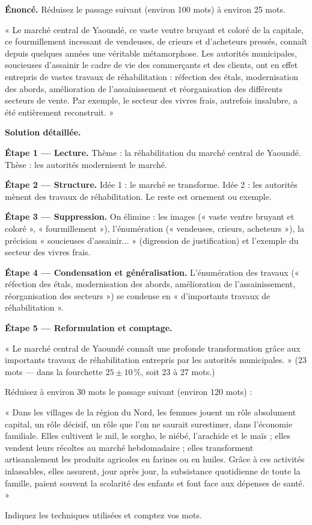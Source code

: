 \documentclass[11pt]{article}
\begin{document}
\begin{exoresolu}
\textbf{Énoncé.} Réduisez le passage suivant (environ 100 mots) à environ 25 mots.

« Le marché central de Yaoundé, ce vaste ventre bruyant et coloré de la capitale, ce fourmillement incessant de vendeuses, de crieurs et d'acheteurs pressés, connaît depuis quelques années une véritable métamorphose. Les autorités municipales, soucieuses d'assainir le cadre de vie des commerçants et des clients, ont en effet entrepris de vastes travaux de réhabilitation : réfection des étals, modernisation des abords, amélioration de l'assainissement et réorganisation des différents secteurs de vente. Par exemple, le secteur des vivres frais, autrefois insalubre, a été entièrement reconstruit. »

\tcblower

\textbf{Solution détaillée.}

\textbf{Étape 1 — Lecture.} Thème : la réhabilitation du marché central de Yaoundé. Thèse : les autorités modernisent le marché.

\textbf{Étape 2 — Structure.} Idée 1 : le marché se transforme. Idée 2 : les autorités mènent des travaux de réhabilitation. Le reste est ornement ou exemple.

\textbf{Étape 3 — Suppression.} On élimine : les images (« vaste ventre bruyant et coloré », « fourmillement »), l'énumération (« vendeuses, crieurs, acheteurs »), la précision « soucieuses d'assainir... » (digression de justification) et l'exemple du secteur des vivres frais.

\textbf{Étape 4 — Condensation et généralisation.} L'énumération des travaux (« réfection des étals, modernisation des abords, amélioration de l'assainissement, réorganisation des secteurs ») se condense en « d'importants travaux de réhabilitation ».

\textbf{Étape 5 — Reformulation et comptage.}

« Le marché central de Yaoundé connaît une profonde transformation grâce aux importants travaux de réhabilitation entrepris par les autorités municipales. » (23 mots — dans la fourchette $25 \pm 10\,\%$, soit 23 à 27 mots.)
\end{exoresolu}

\begin{exercice}
Réduisez à environ 30 mots le passage suivant (environ 120 mots) :

« Dans les villages de la région du Nord, les femmes jouent un rôle absolument capital, un rôle décisif, un rôle que l'on ne saurait surestimer, dans l'économie familiale. Elles cultivent le mil, le sorgho, le niébé, l'arachide et le maïs ; elles vendent leurs récoltes au marché hebdomadaire ; elles transforment artisanalement les produits agricoles en farines ou en huiles. Grâce à ces activités inlassables, elles assurent, jour après jour, la subsistance quotidienne de toute la famille, paient souvent la scolarité des enfants et font face aux dépenses de santé. »

Indiquez les techniques utilisées et comptez vos mots.
\end{exercice}
\end{document}
